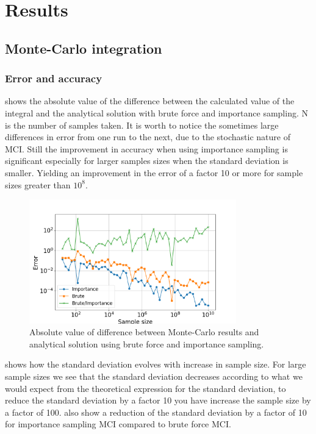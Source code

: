 \section{Results}

\subsection{Monte-Carlo integration}

\subsubsection{Error and accuracy}

 shows the absolute value of the difference between the
calculated value of the integral and the analytical solution with brute force
and importance sampling. N is the number of samples taken. It is worth to notice the sometimes
large differences in error from one run to the next, due to the stochastic nature of
MCI. Still the improvement in accuracy when using importance sampling
is significant especially for larger samples sizes when the standard
deviation is smaller. Yielding an improvement in the error of a factor 10 or
more for sample sizes greater than $10^8$.


\begin{figure}[H]
  \centering
  \includegraphics[width=0.8\textwidth]{../figures/mc_error.png}
  \caption{Absolute value of difference between Monte-Carlo results and analytical
  solution using brute force and importance sampling.}

  \label{fig:mc_error}
\end{figure}


 shows how the standard deviation evolves with increase in
sample size. For large sample sizes we see that the standard deviation decreases
according to what we would expect from the theoretical expression for the standard
deviation, to reduce the standard deviation by a factor 10 you have increase the
sample size by a factor of 100. 
 also show a reduction of the standard deviation by a
factor of 10 for importance sampling MCI compared to brute force MCI.

